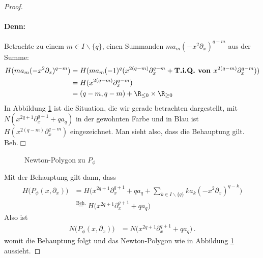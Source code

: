 \begin{proof}
\paragraph{Denn:}
Betrachte zu einem $m\in I\backslash \{q\}$, einen Summanden
$ma_m(-x^2\partial_x)^{q-m}$ aus der Summe:
\begin{align*}
H(ma_m(-x^2\partial_x)^{q-m}) &= H(ma_m(-1)^q(x^{2(q-m)}\partial_x^{q-m}
  +\textbf{T.i.Q. von }x^{2(q-m)}\partial_x^{q-m}))
\\&=H(x^{2(q-m)}\partial_x^{q-m})
\\&=(q-m,q-m) + \R_{\leq 0}\times \R_{\geq 0}
\end{align*}
In Abbildung \ref{fig:Newton-PolygonP_phi} ist die Situation, die wir gerade
betrachten dargestellt, mit $N(x^{2q + 1}\partial_x^{q + 1} + qa_q)$ in der
gewohnten Farbe und in Blau ist $H(x^{2(q-m)}\partial_x^{q-m})$ eingezeichnet.
Man sieht also, dass die Behauptung gilt.
\hfill Beh.\ensuremath{\Box}

\begin{figure}[htbp] %
\begin{center}
\end{center}
\caption{Newton-Polygon zu $P_{\phi}$}
\label{fig:Newton-PolygonP_phi}
\end{figure}
Mit der Behauptung gilt dann, dass
\begin{align*}
H\Big(P_{\phi}(x,\partial_x)\Big) 
  &= H\Big(x^{2q + 1}\partial_x^{q + 1} + qa_q 
  + \sum_{k\in I\backslash\{q\}}k a_k(-x^2\partial_x)^{q-k} \Big)
\\&\overset{\text{Beh.}}{=} H\Big(x^{2q + 1}\partial_x^{q + 1} + qa_q \Big)
\end{align*}
Also ist
\begin{align*}
N\Big(P_{\phi}(x,\partial_x)\Big) 
  &= N\Big(x^{2q + 1}\partial_x^{q + 1} + qa_q \Big) \,.
\end{align*}
womit die Behauptung folgt und das Newton-Polygon wie in Abbildung
\ref{fig:Newton-PolygonP_phi} aussieht.
\end{proof}
